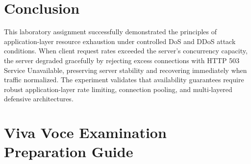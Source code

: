 \documentclass[11pt,a4paper]{article}
\begin{document}
\section{Conclusion}
This laboratory assignment successfully demonstrated the principles of application-layer resource exhaustion under controlled DoS and DDoS attack conditions. When client request rates exceeded the server's concurrency capacity, the server degraded gracefully by rejecting excess connections with HTTP 503 Service Unavailable, preserving server stability and recovering immediately when traffic normalized. The experiment validates that availability guarantees require robust application-layer rate limiting, connection pooling, and multi-layered defensive architectures.

\newpage
\appendix
\section{Viva Voce Examination Preparation Guide}
\end{document}
